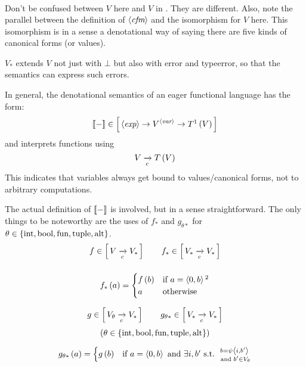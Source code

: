 \begin{enumcirc}
\begin{align*}
	\end{align*}
	\begin{enumrm}
		\item
		Don't be confused between $V$ here and $V$ in .
		They are different.
		Also, note the parallel between the definition of $\gram{cfm}$ and the
		isomorphism for $V$ here.
		This isomorphism is in a sense a denotational way of saying there are five
		kinds of canonical forms (or values).
		\item
		$V_*$ extends $V$ not just with $\bot$ but also with error and typeerror, so that the semantics can express such errors.
		\item
		In general, the denotational semantics of an eager functional language has the
		form:
		\[
			\bbrackets{-} \in \brackets{\gram{exp} \to V^{\gram{var}} \to T \footnotemark \prths{V}}
		\]
		and interprets functions using
		\[
			V \toc T\prths{V}
		\]
		This indicates that variables always get bound to values/canonical forms, not
		to arbitrary computations.
	\end{enumrm}
	\item
	The actual definition of $\bbrackets{-}$ is involved, but in a sense
	straightforward.
	The only things to be noteworthy are the uses of $f_*$ and $g_{\theta *}$ for
	$\theta \in \braces{\textrm{int}, \textrm{bool}, \textrm{fun}, \textrm{tuple},
			\textrm{alt}}$.
	\[
		\begin{array}{c}
			f \in \brackets{V \toc V_*} \qquad f_* \in \brackets{V_* \toc V_*}
			\\[2em]
			f_* \prths{a} =
			\begin{cases}
				f\prths{b} & \textrm{if } a = \chevrons{0, b} \footnotemark \\
				a          & \textrm{otherwise}
			\end{cases}
			\\[2em]
			g \in \brackets{V_\theta \toc V_*} \qquad g_{\theta *} \in \brackets{V_* \toc V_*}
			\\[1em]
			\prths{
				\theta \in \braces{\textrm{int}, \textrm{bool}, \textrm{fun}, \textrm{tuple}, \textrm{alt}}
			}
			\\[1em]
			g_{\theta *} \prths{a} =
			\begin{cases}
				g\prths{b}                       & \textrm{if } a = \chevrons{0, b} \textrm{ and }
				\exists i, b' \textrm{ s.t. } \substack{b = \psi \chevrons{i, b'}                  \\ \textrm{ and } b' \in V_\theta} \\

\end{cases}
\end{array}\]
\end{enumcirc}
